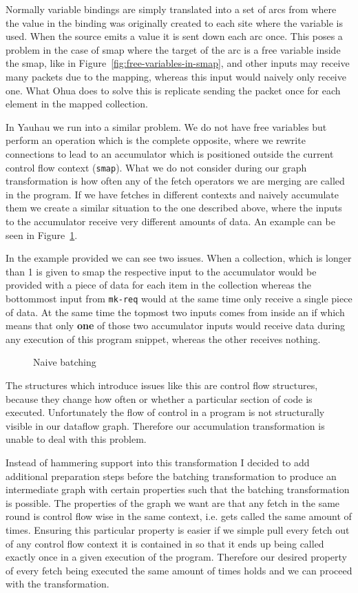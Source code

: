 Normally variable bindings are simply translated into a set of arcs from where the value in the binding was originally created to each site where the variable is used.
When the source emits a value it is sent down each arc once.
This poses a problem in the case of smap where the target of the arc is a free variable inside the smap, like in Figure~\ref{fig:free-variables-in-smap}, and other inputs may receive many packets due to the mapping, whereas this input would naively only receive one.
What Ohua does to solve this is replicate sending the packet once for each element in the mapped collection.

In Yauhau we run into a similar problem.
We do not have free variables but perform an operation which is the complete opposite, where we rewrite connections to lead to an accumulator which is positioned outside the current control flow context (\texttt{smap}).
What we do not consider during our graph transformation is how often any of the fetch operators we are merging are called in the program.
If we have fetches in different contexts and naively accumulate them we create a similar situation to the one described above, where the inputs to the accumulator receive very different amounts of data.
An example can be seen in Figure~\ref{fig:naive-batching-context-problem}.

In the example provided we can see two issues.
When a collection, which is longer than 1 is given to smap the respective input to the accumulator would be provided with a piece of data for each item in the collection whereas the bottommost input from \texttt{mk-req} would at the same time only receive a single piece of data.
At the same time the topmost two inputs comes from inside an if which means that only \textbf{one} of those two accumulator inputs would receive data during any execution of this program snippet, whereas the other receives nothing.

\begin{figure}
	\caption{Naive batching}
	\label{fig:naive-batching-context-problem}
\end{figure}

The structures which introduce issues like this are control flow structures, because they change how often or whether a particular section of code is executed.
Unfortunately the flow of control in a program is not structurally visible in our dataflow graph.
Therefore our accumulation transformation is unable to deal with this problem.

Instead of hammering support into this transformation I decided to add additional preparation steps before the batching transformation to produce an intermediate graph with certain properties such that the batching transformation is possible.
The properties of the graph we want are that any fetch in the same round is control flow wise in the same context, i.e. gets called the same amount of times.
Ensuring this particular property is easier if we simple pull every fetch out of any control flow context it is contained in so that it ends up being called exactly once in a given execution of the program.
Therefore our desired property of every fetch being executed the same amount of times holds and we can proceed with the transformation.

